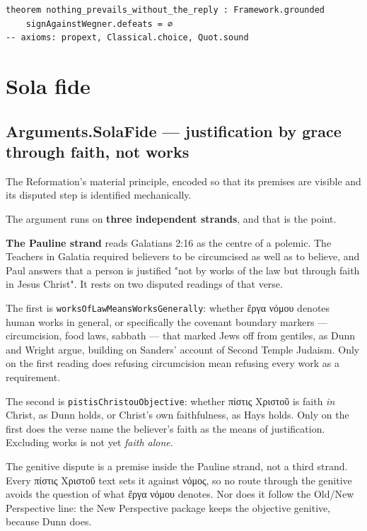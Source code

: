 \documentclass[11pt]{article}
\begin{document}
{\small\begin{verbatim}
theorem nothing_prevails_without_the_reply : Framework.grounded
    signAgainstWegner.defeats = ∅
-- axioms: propext, Classical.choice, Quot.sound
\end{verbatim}}
\clearpage
\section*{Sola fide}

\subsection*{Arguments.SolaFide — justification by grace through faith, not works}
The Reformation's material principle, encoded so that its premises are visible and its disputed step is identified mechanically.

The argument runs on \textbf{three independent strands}, and that is the point.

\textbf{The Pauline strand} reads Galatians 2:16 as the centre of a polemic. The Teachers in Galatia required believers to be circumcised as well as to believe, and Paul answers that a person is justified "not by works of the law but through faith in Jesus Christ". It rests on two disputed readings of that verse.

The first is \texttt{works\allowbreak{}Of\allowbreak{}Law\allowbreak{}Means\allowbreak{}Works\allowbreak{}Generally}: whether ἔργα νόμου denotes human works in general, or specifically the covenant boundary markers — circumcision, food laws, sabbath — that marked Jews off from gentiles, as Dunn and Wright argue, building on Sanders' account of Second Temple Judaism. Only on the first reading does refusing circumcision mean refusing every work as a requirement.

The second is \texttt{pistis\allowbreak{}Christou\allowbreak{}Objective}: whether πίστις Χριστοῦ is faith \emph{in} Christ, as Dunn holds, or Christ's own faithfulness, as Hays holds. Only on the first does the verse name the believer's faith as the means of justification. Excluding works is not yet \emph{faith alone}.

The genitive dispute is a premise inside the Pauline strand, not a third strand. Every πίστις Χριστοῦ text sets it against νόμος, so no route through the genitive avoids the question of what ἔργα νόμου denotes. Nor does it follow the Old/New Perspective line: the New Perspective package keeps the objective genitive, because Dunn does.
\end{document}
